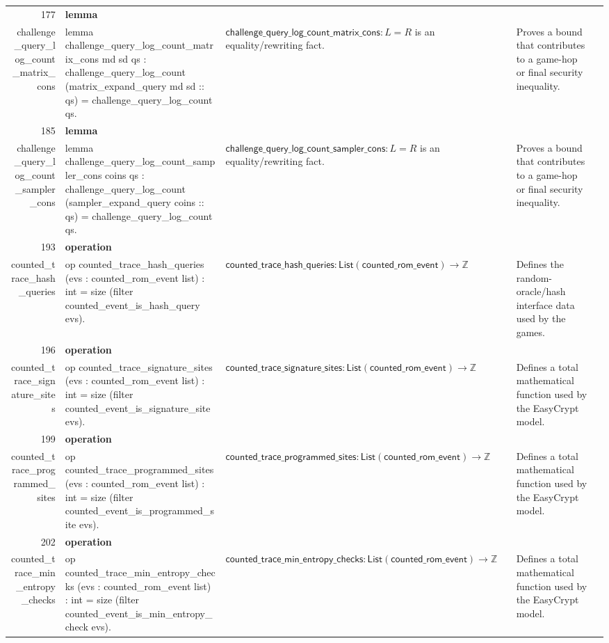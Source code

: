\documentclass[10pt]{article}
\newcommand{\ec}[1]{\begingroup\ttfamily\scriptsize #1\endgroup}
\begin{document}
\begin{longtable}{r L{0.17\textwidth} L{0.26\textwidth} L{0.27\textwidth} L{0.20\textwidth}}
177 & \textbf{lemma}\\\ec{challenge\_query\_log\_count\_matrix\_cons} & \ec{lemma challenge\_query\_log\_count\_matrix\_cons md sd qs : challenge\_query\_log\_count (matrix\_expand\_query md sd :: qs) = challenge\_query\_log\_count qs.} & \(\mathsf{challenge\_query\_log\_count\_matrix\_cons} : L = R\) is an equality/rewriting fact. & Proves a bound that contributes to a game-hop or final security inequality. \\
185 & \textbf{lemma}\\\ec{challenge\_query\_log\_count\_sampler\_cons} & \ec{lemma challenge\_query\_log\_count\_sampler\_cons coins qs : challenge\_query\_log\_count (sampler\_expand\_query coins :: qs) = challenge\_query\_log\_count qs.} & \(\mathsf{challenge\_query\_log\_count\_sampler\_cons} : L = R\) is an equality/rewriting fact. & Proves a bound that contributes to a game-hop or final security inequality. \\
193 & \textbf{operation}\\\ec{counted\_trace\_hash\_queries} & \ec{op counted\_trace\_hash\_queries (evs : counted\_rom\_event list) : int = size (filter counted\_event\_is\_hash\_query evs).} & \(\mathsf{counted\_trace\_hash\_queries} : \mathsf{List}(\mathsf{counted\_rom\_event}) \to \mathbb{Z}\) & Defines the random-oracle/hash interface data used by the games. \\
196 & \textbf{operation}\\\ec{counted\_trace\_signature\_sites} & \ec{op counted\_trace\_signature\_sites (evs : counted\_rom\_event list) : int = size (filter counted\_event\_is\_signature\_site evs).} & \(\mathsf{counted\_trace\_signature\_sites} : \mathsf{List}(\mathsf{counted\_rom\_event}) \to \mathbb{Z}\) & Defines a total mathematical function used by the EasyCrypt model. \\
199 & \textbf{operation}\\\ec{counted\_trace\_programmed\_sites} & \ec{op counted\_trace\_programmed\_sites (evs : counted\_rom\_event list) : int = size (filter counted\_event\_is\_programmed\_site evs).} & \(\mathsf{counted\_trace\_programmed\_sites} : \mathsf{List}(\mathsf{counted\_rom\_event}) \to \mathbb{Z}\) & Defines a total mathematical function used by the EasyCrypt model. \\
202 & \textbf{operation}\\\ec{counted\_trace\_min\_entropy\_checks} & \ec{op counted\_trace\_min\_entropy\_checks (evs : counted\_rom\_event list) : int = size (filter counted\_event\_is\_min\_entropy\_check evs).} & \(\mathsf{counted\_trace\_min\_entropy\_checks} : \mathsf{List}(\mathsf{counted\_rom\_event}) \to \mathbb{Z}\) & Defines a total mathematical function used by the EasyCrypt model. \\

\end{longtable}
\end{document}
